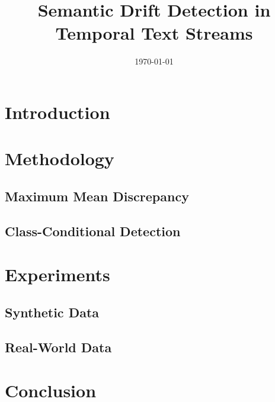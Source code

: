 \documentclass[12pt]{article}
\title{Semantic Drift Detection in Temporal Text Streams}
\author{}
\date{\today}
\begin{document}
\maketitle

\begin{abstract}
\end{abstract}

\section{Introduction}

\section{Methodology}
\subsection{Maximum Mean Discrepancy}

\subsection{Class-Conditional Detection}

\section{Experiments}
\subsection{Synthetic Data}

\subsection{Real-World Data}

\section{Conclusion}


\end{document}
